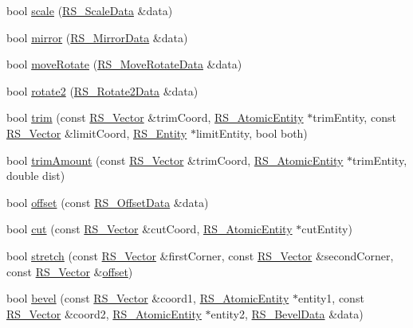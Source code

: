 \begin{DoxyCompactItemize}
\item 
bool \hyperlink{classRS__Modification_a1dfb44befce0ebef87a325ae9b6de72c}{scale} (\hyperlink{classRS__ScaleData}{R\-S\-\_\-\-Scale\-Data} \&data)
\item 
bool \hyperlink{classRS__Modification_adc8c5e6267d9e967a0f5b37c9b8c6d42}{mirror} (\hyperlink{classRS__MirrorData}{R\-S\-\_\-\-Mirror\-Data} \&data)
\item 
bool \hyperlink{classRS__Modification_a7453009dea7bbf6d71aea8615d19f33f}{move\-Rotate} (\hyperlink{classRS__MoveRotateData}{R\-S\-\_\-\-Move\-Rotate\-Data} \&data)
\item 
bool \hyperlink{classRS__Modification_a174b48e2855f55c3c12be93f58f170b0}{rotate2} (\hyperlink{classRS__Rotate2Data}{R\-S\-\_\-\-Rotate2\-Data} \&data)
\item 
bool \hyperlink{classRS__Modification_a7f794c7e3371b30d06ef17b17d6d453e}{trim} (const \hyperlink{classRS__Vector}{R\-S\-\_\-\-Vector} \&trim\-Coord, \hyperlink{classRS__AtomicEntity}{R\-S\-\_\-\-Atomic\-Entity} $\ast$trim\-Entity, const \hyperlink{classRS__Vector}{R\-S\-\_\-\-Vector} \&limit\-Coord, \hyperlink{classRS__Entity}{R\-S\-\_\-\-Entity} $\ast$limit\-Entity, bool both)
\item 
bool \hyperlink{classRS__Modification_a7340fadf888f8dfc606df0d6f38c6343}{trim\-Amount} (const \hyperlink{classRS__Vector}{R\-S\-\_\-\-Vector} \&trim\-Coord, \hyperlink{classRS__AtomicEntity}{R\-S\-\_\-\-Atomic\-Entity} $\ast$trim\-Entity, double dist)
\item 
bool \hyperlink{classRS__Modification_ada921c817299b5907b7e0c56c0110a3a}{offset} (const \hyperlink{classRS__OffsetData}{R\-S\-\_\-\-Offset\-Data} \&data)
\item 
bool \hyperlink{classRS__Modification_a00801a57ee3f9f1c1b85e478ba5ae3dd}{cut} (const \hyperlink{classRS__Vector}{R\-S\-\_\-\-Vector} \&cut\-Coord, \hyperlink{classRS__AtomicEntity}{R\-S\-\_\-\-Atomic\-Entity} $\ast$cut\-Entity)
\item 
bool \hyperlink{classRS__Modification_abc425fd3fbd8ccb60160d90688b1d4f6}{stretch} (const \hyperlink{classRS__Vector}{R\-S\-\_\-\-Vector} \&first\-Corner, const \hyperlink{classRS__Vector}{R\-S\-\_\-\-Vector} \&second\-Corner, const \hyperlink{classRS__Vector}{R\-S\-\_\-\-Vector} \&\hyperlink{classRS__Modification_ada921c817299b5907b7e0c56c0110a3a}{offset})
\item 
bool \hyperlink{classRS__Modification_a71047a1dcd7a49f051b4d6b13f7afa57}{bevel} (const \hyperlink{classRS__Vector}{R\-S\-\_\-\-Vector} \&coord1, \hyperlink{classRS__AtomicEntity}{R\-S\-\_\-\-Atomic\-Entity} $\ast$entity1, const \hyperlink{classRS__Vector}{R\-S\-\_\-\-Vector} \&coord2, \hyperlink{classRS__AtomicEntity}{R\-S\-\_\-\-Atomic\-Entity} $\ast$entity2, \hyperlink{classRS__BevelData}{R\-S\-\_\-\-Bevel\-Data} \&data)

\end{DoxyCompactItemize}
